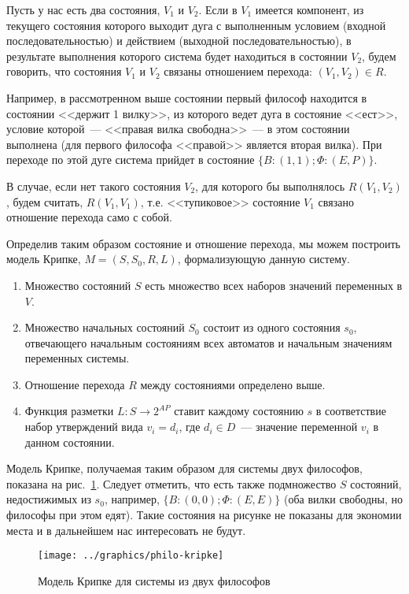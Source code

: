Пусть у нас есть два состояния, $V_1$ и $V_2$. Если в $V_1$ имеется компонент, из текущего
состояния которого выходит дуга с выполненным условием (входной последовательностью) и
действием (выходной последовательностью), в результате выполнения которого система будет
находиться в состоянии $V_2$, будем говорить, что состояния $V_1$ и $V_2$ связаны
отношением перехода: $(V_1, V_2) \in R$.

Например, в рассмотренном выше состоянии первый философ находится в состоянии <<держит 1
вилку>>, из которого ведет дуга в состояние <<ест>>, условие которой~--- <<правая вилка
свободна>>~--- в этом состоянии выполнена (для первого философа <<правой>> является вторая
вилка). При переходе по этой дуге система прийдет в состояние $\{B: (1, 1); \Phi: (E,
P)\}$.

В случае, если нет такого состояния $V_2$, для которого бы выполнялось $R(V_1, V_2)$,
будем считать, $R(V_1, V_1)$, т.е. <<тупиковое>> состояние $V_1$ связано отношение
перехода само с собой.

Определив таким образом состояние и отношение перехода, мы можем построить модель Крипке,
$M = (S, S_0, R, L)$, формализующую данную систему.
\begin{enumerate}
\item Множество состояний $S$ есть множество всех наборов значений переменных в $V$.
\item Множество начальных состояний $S_0$ состоит из одного состояния $s_0$, отвечающего
  начальным состояниям всех автоматов и начальным значениям переменных системы.
\item Отношение перехода $R$ между состояниями определено выше.
\item Функция разметки $L\colon S \rightarrow 2^{AP}$ ставит каждому состоянию $s$ в
  соответствие набор утверждений вида $v_i = d_i$, где $d_i \in D$~--- значение переменной
  $v_i$ в данном состоянии.
\end{enumerate}

Модель Крипке, получаемая таким образом для системы двух философов, показана на
рис.~\ref{fig:philo2-kripke}. Следует отметить, что есть также подмножество $S$ состояний,
недостижимых из $s_0$, например, $\{B: (0, 0); \Phi: (E, E)\}$ (оба вилки свободны, но
философы при этом едят). Такие состояния на рисунке не показаны для экономии места и в
дальнейшем нас интересовать не будут.

\begin{figure}[ht]
  \centering
  \texttt{[image: ../graphics/philo-kripke]}
  \caption{Модель Крипке для системы из двух философов}
  \label{fig:philo2-kripke}
\end{figure}

